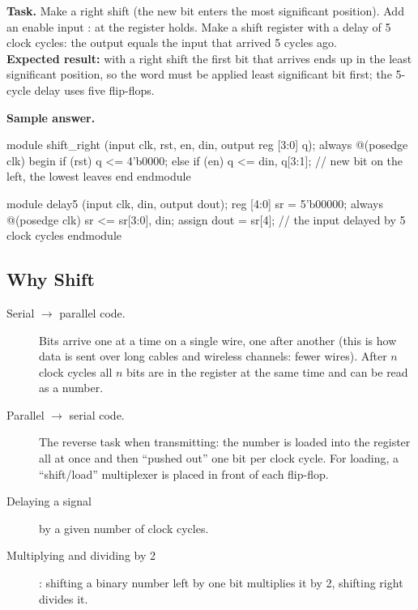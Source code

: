 \begin{diybox}
\textbf{Task.}  Make a right shift (the new bit enters the most
significant position).  Add an enable input : at 
the register holds.  Make a shift register with a delay of 5 clock
cycles: the output equals the input that arrived 5 cycles ago.\\
\textbf{Expected result:} with a right shift the first bit that arrives ends up in
the least significant position, so the word must be applied least significant
bit first; the 5-cycle delay uses five flip-flops.
\end{diybox}

\textbf{Sample answer.}
\begin{vcode}
module shift_right (input clk, rst, en, din, output reg [3:0] q);
    always @(posedge clk) begin
        if (rst)     q <= 4'b0000;
        else if (en) q <= {din, q[3:1]};   // new bit on the left, the lowest leaves
    end
endmodule

module delay5 (input clk, din, output dout);
    reg [4:0] sr = 5'b00000;
    always @(posedge clk) sr <= {sr[3:0], din};
    assign dout = sr[4];                    // the input delayed by 5 clock cycles
endmodule
\end{vcode}

\subsection{Why Shift}

\begin{description}
  \item[Serial $\to$ parallel code.] Bits arrive one at a time on a single wire,
    one after another (this is how data is sent over long cables and
    wireless channels: fewer wires). After
    $n$ clock cycles all $n$ bits are in the register at the same time and can be
    read as a number. 
  \item[Parallel $\to$ serial code.] The reverse task when transmitting: the
    number is loaded into the register all at once and then ``pushed out'' one
    bit per clock cycle. For loading, a ``shift/load'' multiplexer is placed in
    front of each flip-flop.
  \item[Delaying a signal] by a given number of clock cycles.
  \item[Multiplying and dividing by 2]: shifting a binary number left by one bit
    multiplies it by 2, shifting right divides it.
\end{description}

